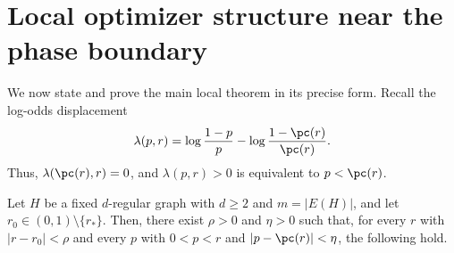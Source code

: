 \section{Local optimizer structure near the phase boundary}\label{sec:local-optimizer-structure}

We now state and prove the main local theorem in its precise form.
Recall the log-odds displacement
\[
  \lambda(p,r)=
  \log\frac{1-p}{p}-\log\frac{1-\pc(r)}{\pc(r)}.
\]
Thus, $\lambda(\pc(r),r)=0$, and $\lambda(p,r)>0$ is equivalent to
$p<\pc(r)$.

\begin{theorem}\label{thm:local-optimizer-structure}
Let $H$ be a fixed $d$-regular graph with $d\ge2$ and $m=|E(H)|$, and let
$r_0\in(0,1)\setminus\{r_*\}$.
Then, there exist $\rho>0$ and $\eta>0$ such that, for every
$r$ with $|r-r_0|<\rho$ and every $p$ with $0<p<r$ and
$|p-\pc(r)|<\eta$, the following hold.


\end{theorem}
